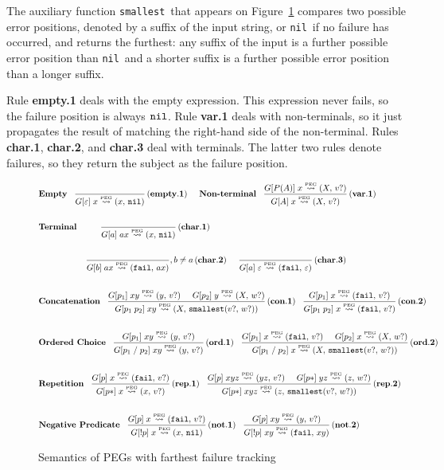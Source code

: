 \documentclass[3p,12pt,singlecolumn]{elsarticle}
\newcommand{\fivespaces}{\;\;\;\;\;}
\newcommand{\tenspaces}{\fivespaces\fivespaces}
\newcommand{\twentyspaces}{\tenspaces\tenspaces}
\newcommand{\mylabel}[1]{\, \mathbf{(#1)}}
\newcommand{\Lp}{\stackrel{\mbox{\tiny{PEG}}}{\leadsto}}
\newcommand{\Tup}[2]{(#1,\,#2)}
\newcommand{\Any}{X}
\newcommand{\Ex}{v?}
\newcommand{\Ey}{w?}
\newcommand{\Suf}{{\tt smallest}}
\newcommand{\Suff}[2]{\Suf(#1,\,#2)}
\newcommand{\Fail}{{\tt fail}}
\newcommand{\Nil}{{\tt nil}}
\begin{document}
The auxiliary function \Suf\ that appears on
Figure~\ref{fig:semfarthest} compares two possible
error positions, denoted by a suffix of the
input string, or \Nil\, if no failure has occurred,
and returns the furthest: any suffix of the input
is a further possible error position than \Nil\,
and a shorter suffix is a further possible
error position than a longer suffix.

Rule {\bf empty.1} deals with the empty expression. This
expression never fails, so the failure position is always
$\Nil$. Rule {\bf var.1} deals with
non-terminals, so it just propagates the result of
matching the right-hand side of the non-terminal.
Rules {\bf char.1}, {\bf char.2}, and {\bf char.3} deal with
terminals. The latter two rules denote failures, so they
return the subject as the failure position.

\begin{figure}[t]
	{\small
		\begin{align*}
& \textbf{Empty} \;\;\;
		{\frac{}{G[\varepsilon] \; x \Lp \Tup{x}{\Nil}}} \mylabel{empty.1}
\fivespaces \textbf{Non-terminal} \;\;\;
		{\frac{G[P(A)] \; x \Lp \Tup{\Any}{\Ex}}
			{G[A] \; x \Lp \Tup{\Any}{\Ex}}} \mylabel{var.1}
		\\ \\
& \textbf{Terminal} \tenspaces 
		{\frac{}{G[a] \; ax \Lp \Tup{x}{\Nil}}} \mylabel{char.1} \\ \\
		& \twentyspaces
		{\frac{}{G[b] \; ax \Lp \Tup{\Fail}{ax}}}, b \ne a \mylabel{char.2}
		\fivespaces
		{\frac{}{G[a] \; \varepsilon \Lp \Tup{\Fail}{\varepsilon}}} \mylabel{char.3}
		\\ \\
& \textbf{Concatenation} \;\;\;
		{\frac{G[p_1] \; xy \Lp \Tup{y}{\Ex} \fivespaces G[p_2] \; y \Lp \Tup{\Any}{\Ey}}
			{G[p_1 \; p_2] \; xy \Lp \Tup{\Any}{\Suff{\Ex}{\Ey}}}}   \mylabel{con.1}
		\;\;\;
		{\frac{G[p_1] \; x \Lp \Tup{\Fail}{\Ex}}
			{G[p_1 \; p_2] \; x \Lp \Tup{\Fail}{\Ex}}} \mylabel{con.2}
		\\ \\
& \textbf{Ordered Choice} \;\;\;
		{\frac{G[p_1] \; xy \Lp \Tup{y}{\Ex}}
			{G[p_1 \;/\; p_2] \; xy \Lp \Tup{y}{\Ex}}} \mylabel{ord.1}
		\;\;\;
		{\frac{G[p_1] \; x \Lp \Tup{\Fail}{\Ex} \fivespaces G[p_2] \; x \Lp \Tup{\Any}{\Ey}}
			{G[p_1 \;/\; p_2] \; x \Lp \Tup{\Any}{\Suff{\Ex}{\Ey}}}}  \mylabel{ord.2}
		\\ \\
& \textbf{Repetition} \;\;\;
		{\frac{G[p] \; x \Lp \Tup{\Fail}{\Ex}}
			{G[p*] \; x \Lp \Tup{x}{\Ex}}} \mylabel{rep.1}
		\;\;\;
		{\frac{G[p] \; xyz \Lp \Tup{yz}{\Ex} \fivespaces G[p*] \; yz \Lp \Tup{z}{\Ey}}
			{G[p*] \; xyz \Lp \Tup{z}{\Suff{\Ex}{\Ey}}}} \mylabel{rep.2}
		\\ \\
& \textbf{Negative Predicate} \;\;\;
		{\frac{G[p] \; x \Lp \Tup{\Fail}{\Ex}}
			{G[!p] \; x \Lp \Tup{x}{\Nil}}} \mylabel{not.1}
		\;\;\;
		{\frac{G[p] \; xy \Lp \Tup{y}{\Ex}}
			{G[!p] \; xy \Lp \Tup{\Fail}{xy}}} \mylabel{not.2}
		\end{align*}
	}
	\caption{Semantics of PEGs with farthest failure tracking}
	\label{fig:semfarthest}
\end{figure}
\end{document}
